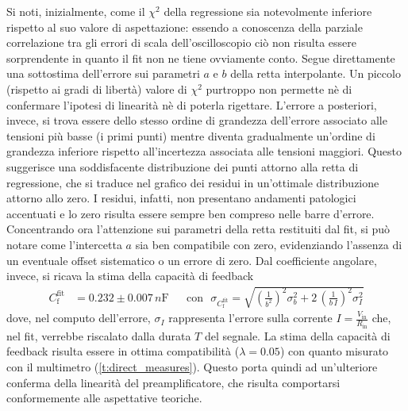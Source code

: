 \documentclass[a4paper,11pt]{article} %
\begin{document}
\noindent Si noti, inizialmente, come il $\chi^2$ della regressione sia notevolmente inferiore rispetto al suo valore di
aspettazione: essendo a conoscenza della parziale correlazione tra gli errori di scala dell'oscilloscopio ciò non
risulta essere sorprendente in quanto il fit non ne tiene ovviamente conto. Segue direttamente una sottostima
dell'errore sui parametri $a$ e $b$ della retta interpolante. Un piccolo (rispetto ai gradi di libertà) valore di
$\chi^2$ purtroppo non permette nè di confermare l'ipotesi di linearità nè di poterla rigettare. L'errore a posteriori,
invece, si trova essere dello stesso ordine di grandezza dell'errore associato alle tensioni più basse (i primi punti)
mentre diventa gradualmente un'ordine di grandezza inferiore rispetto all'incertezza associata alle tensioni maggiori.
Questo suggerisce una soddisfacente distribuzione dei punti attorno alla retta di regressione, che si traduce nel
grafico dei residui in un'ottimale distribuzione attorno allo zero. I residui, infatti, non presentano andamenti
patologici accentuati e lo zero risulta essere sempre ben compreso nelle barre d'errore. Concentrando ora l'attenzione
sui parametri della retta restituiti dal fit, si può notare come l'intercetta $a$ sia ben compatibile con zero,
evidenziando l'assenza di un eventuale offset sistematico o un errore di zero. Dal coefficiente angolare, invece, si
ricava la stima della capacità di feedback 
\begin{align}
	C_{\text{f}}^{\text{fit}}& = 0.232 \pm 0.007 \,\si{n\farad} 
	& 
	&\text{con} \,\,\,\, \sigma_{ C_{\text{f}}^{\text{fit}} } = 
	\sqrt
	{ 
		\left(
			\frac{1}{b^2}
		\right)^2
		\sigma_b^2 +
		2 \, \left(
			\frac{1}{b\,I}
		\right)^2
		\sigma_I^2
	}
\end{align}
\noindent dove, nel computo dell'errore, $\sigma_I$ rappresenta l'errore sulla corrente $I =
\frac{V_{\text{in}}}{R_{\text{in}}}$ che, nel fit, verrebbe riscalato dalla durata $T$ del segnale. La stima della
capacità di feedback risulta essere in ottima compatibilità ($\lambda = 0.05$) con quanto misurato con il multimetro
(\autoref{t:direct_measures}). Questo porta quindi ad un'ulteriore conferma della linearità del preamplificatore, che
risulta comportarsi conformemente alle aspettative teoriche. 

\end{document}
